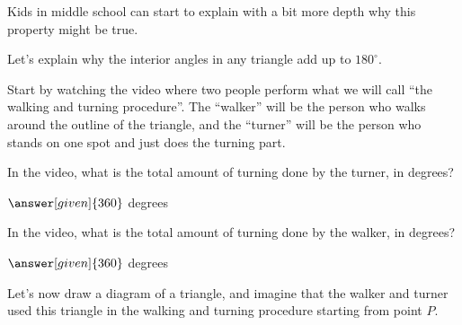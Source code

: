 \documentclass{ximera}
\begin{document}
Kids in middle school can start to explain with a bit more depth why this property might be true.
\begin{explanation}
Let's explain why the interior angles in any triangle add up to $180^{\circ}$.

Start by watching the video where two people perform what we will call ``the walking and turning procedure''. The ``walker'' will be the person who walks around the outline of the triangle, and the ``turner'' will be the person who stands on one spot and just does the turning part.

In the video, what is the total amount of turning done by the turner, in degrees?
\begin{prompt}
	$\answer[given]{360}$ degrees
\end{prompt}

In the video, what is the total amount of turning done by the walker, in degrees?
\begin{prompt}
	$\answer[given]{360}$ degrees
\end{prompt}

Let's now draw a diagram of a triangle, and imagine that the walker and turner used this triangle in the walking and turning procedure starting from point $P$.
\begin{image}
\end{image}


\end{explanation}
\end{document}
